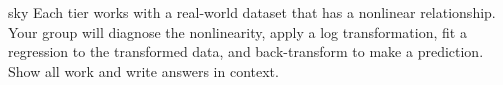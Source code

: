 \documentclass[10pt]{article}
\begin{document}
\namepartnerperiod

\vspace{0.18in}

\begin{scenariobox}[Context]{sky}
\small
Each tier works with a real-world dataset that has a nonlinear relationship. Your group will
diagnose the nonlinearity, apply a log transformation, fit a regression to the transformed
data, and back-transform to make a prediction. Show all work and write answers in context.
\end{scenariobox}

\vspace{0.12in}

\end{document}

